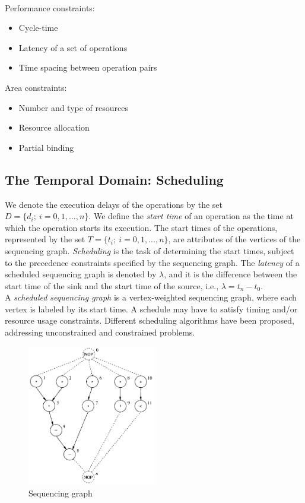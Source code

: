 \bigskip \\
Performance constraints:
\begin{itemize}
\item Cycle-time
\item Latency of a set of operations
\item Time spacing between operation pairs\
\end{itemize}
Area constraints:
\begin{itemize}
\item Number and type of resources
\item Resource allocation
\item Partial binding
\end{itemize}

\subsection{The Temporal Domain: Scheduling}
We denote the execution delays of the operations by the set $ D = \lbrace d_{i};\:i=0,1,...,n \rbrace $. We define the  \textit{start time} of an operation as the time at which the operation starts its execution. The start times of the operations, represented by the set $ T = \lbrace t_{i};\:i=0,1,...,n \rbrace $,  are attributes of the vertices of the sequencing graph.  \textit{Scheduling}  is the task of determining the start times, subject to the precedence constraints specified by the sequencing graph. The \textit{latency} of a scheduled sequencing graph is denoted by $ \lambda $,  and it is the difference between the start time of the sink and the start time of the source, i.e.,  $ \lambda=t_{n}-t_{0} $.\\
A \textit{ scheduled sequencing  graph}  is a vertex-weighted sequencing graph, where each vertex is labeled by its start time.  A  schedule may have to satisfy timing and/or resource usage constraints. Different scheduling algorithms have been proposed, addressing unconstrained and constrained problems.
\begin{figure}[H]
	 \centering
	 \includegraphics[width=0.5\textwidth]{./Cap3/Images/Image16.png}
	 \caption[Optional caption]{Sequencing  graph}
	 \label{fig:Sequ}
\end{figure}
